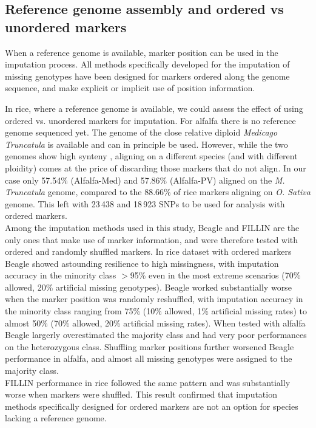 \subsection{Reference genome assembly and ordered vs unordered markers}
\label{sec:reference_genome_ordered_vs_unordered}
When a reference genome is available, marker position can be used in the imputation process. All methods specifically developed for the imputation of missing genotypes have been designed for markers ordered along the genome sequence, and make explicit or implicit use of position information.

In rice, where a reference genome is available, we could assess the effect of using ordered vs. unordered markers for imputation. For alfalfa there is no reference genome sequenced yet. The genome of the close relative diploid \emph{Medicago Truncatula} is available \cite{young_medicago_2011} and can in principle be used. However, while the two genomes show high synteny \cite{li_saturated_2014}, aligning on a different species (and with different ploidity) comes at the price of discarding those markers that do not align. In our case only 57.54\% (Alfalfa-Med) and 57.86\% (Alfalfa-PV) aligned on the \emph{M. Truncatula} genome, compared to the 88.66\% of rice markers aligning on \emph{O. Sativa} genome. This left with 23\,438 and 18\,923 SNPs to be used for analysis with ordered markers. \\
Among the imputation methods used in this study, Beagle and FILLIN are the only ones that make use of marker information, and were therefore tested with ordered and randomly shuffled markers. In rice dataset with ordered markers Beagle showed astounding resilience to high missingness, with imputation accuracy in the minority class $>$95\% even in the most extreme scenarios (70\% allowed, 20\% artificial missing genotypes).
Beagle worked substantially worse when the marker position was randomly reshuffled, with imputation accuracy in the minority class ranging from 75\% (10\% allowed, 1\% artificial missing rates) to almost 50\% (70\% allowed, 20\% artificial missing rates). When tested with alfalfa Beagle largerly overestimated the majority class and had very poor performances on the heterozygous class. Shuffling marker positions further worsened Beagle performance in alfalfa, and almost all missing genotypes were assigned to the majority class.\\
FILLIN performance in rice followed the same pattern and was substantially worse when markers were shuffled. This result confirmed that imputation methods specifically designed for ordered markers are not an option for species lacking a reference genome.

